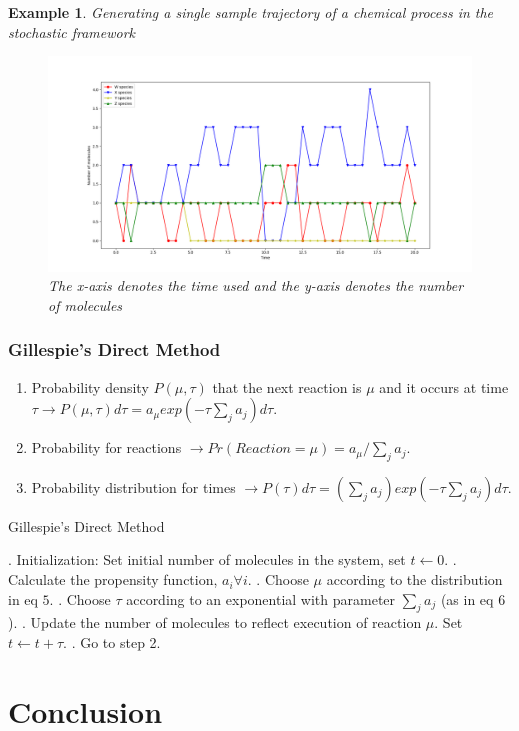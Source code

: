 \documentclass[11pt,a4paper]{article}
\newtheorem{example}[theorem]{Example}
\begin{document}
\begin{example}{Generating a single sample trajectory of a chemical process
in the stochastic framework}
  \begin{figure}[!h]
  \centering
  \includegraphics[width=1\textwidth]{Images/Figure_1.png}
  \caption{The x-axis denotes the time used and the y-axis denotes the number of molecules}
  \label{fig: Single sample trajectory}
  \end{figure}
\end{example}

\subsubsection{Gillespie's Direct Method}
\begin{enumerate}
  \item Probability density $P(\mu, \tau)$ that the next reaction is $\mu$ and it occurs at time $\tau \rightarrow P(\mu, \tau)d\tau = a_{\mu}exp(-\tau \sum_{j}a_{j})d\tau$.
  \item Probability for reactions $\rightarrow Pr(Reaction = \mu) = a_{\mu} / \sum_{j}a_{j}$.
  \item Probability distribution for times $\rightarrow P(\tau)d\tau = (\sum_{j}a_{j})exp(-\tau \sum_{j}a_{j})d\tau$.
\end{enumerate}

    \begin{algorithm}[!h]                     %
    \caption{Gillespie's Direct Method}           %
    \begin{algorithmic}                       %
    \REQUIRE
    \ENSURE

    . Initialization: Set initial number of molecules in the system, set $t \leftarrow 0$.
    . Calculate the propensity function, $a_{i} \forall i$.
    . Choose $\mu$ according to the distribution in eq $5$.
    . Choose $\tau$ according to an exponential with parameter $\sum_{j}a_{j}$ (as in eq $6$).
    . Update the number of molecules to reflect execution of reaction $\mu$. Set $t \leftarrow t + \tau$.
    . Go to step 2.

    \ENDWHILE
    \end{algorithmic}
    \end{algorithm}



\section{Conclusion}

\newpage


\end{document}

